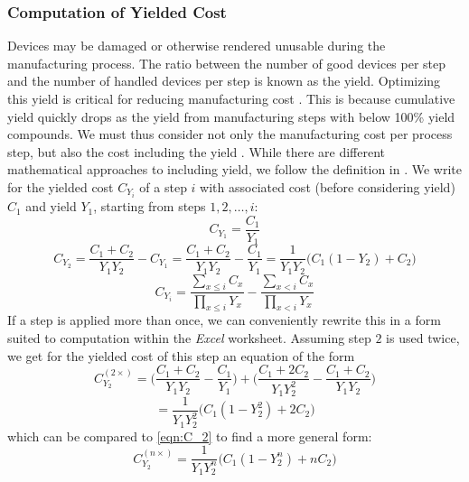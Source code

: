 \documentclass[parskip=full]{article}
\begin{document}
\subsubsection{Computation of Yielded Cost}

Devices may be damaged or otherwise rendered unusable during the manufacturing process. The ratio between the number of good devices per step and the number of handled devices per step is known as the yield. Optimizing this yield is critical for reducing manufacturing cost \cite{Kumar2006}. This is because cumulative yield quickly drops as the yield from manufacturing steps with below 100\% yield compounds. We must thus consider not only the manufacturing cost per process step, but also the cost including the yield \cite{becker2001use}\cite{becker2001using}. While there are different mathematical approaches to including yield, we follow the definition in \cite{becker2001use}. We write for the yielded cost $C_{Y_i}$ of a step $i$ with associated cost (before considering yield) $C_1$ and yield $Y_1$, starting from steps $1,2,\dots,i$:
%
\begin{equation}
\label{eqn:C_2}
    C_{Y_1} = \frac{C_1}{Y_1}
\end{equation}
\begin{equation}
    C_{Y_2} = \frac{C_1 + C_2}{Y_1 Y_2} - C_{Y_1} = \frac{C_1 + C_2}{Y_1 Y_2} - \frac{C_1}{Y_1} = \frac{1}{Y_1 Y_2} \bigg ( C_1 (1-Y_2) +C_2 \bigg)
\end{equation}
\begin{equation}
    C_{Y_i} = \frac{ \sum_{x \leq i} C_x }{ \prod_{x \leq i} Y_x } - \frac{ \sum_{x<i} C_x }{ \prod_{x<i} Y_x }
\end{equation}
%
If a step is applied more than once, we can conveniently rewrite this in a form suited to computation within the \textit{Excel} worksheet. Assuming step $2$ is used twice, we get for the yielded cost of this step an equation of the form
%
\begin{equation}
\label{eqn:C_2^2}
    C_{Y_2}^{(2 \times)} = \bigg( \frac{C_1 + C_2}{Y_1 Y_2} - \frac{C_1}{Y_1} \bigg) + \bigg( \frac{C_1 + 2 C_2}{Y_1 Y_2^2} - \frac{C_1 + C_2}{Y_1 Y_2}     \bigg)
\end{equation}
%
\begin{equation}
    = \frac{1}{Y_1 Y_2^2} \bigg( C_1 (1-Y_2^2) +2C_2 \bigg)
\end{equation}
%
which can be compared to  \cref{eqn:C_2} to find a more general form:
%
\begin{equation}
    C_{Y_2}^{(n \times)} = \frac{1}{Y_1 Y_2^n} \bigg( C_1 (1-Y_2^n)+nC_2\bigg)
\end{equation}
\end{document}
